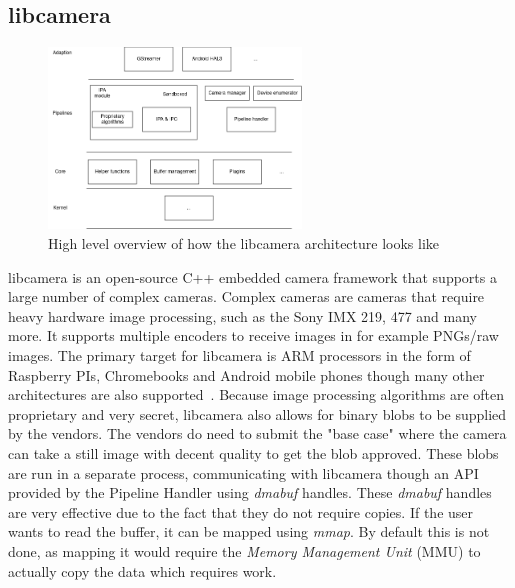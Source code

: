\subsection{libcamera}
\begin{figure}
    \begin{center}
        \includegraphics[width=0.60\textwidth]{figures/libcameraarch.png}
    \end{center}
    \caption{High level overview of how the libcamera architecture looks like}
    \label{fig:libcameraarch}
\end{figure}

libcamera is an open-source C++ embedded camera framework that supports a large
number of complex cameras. Complex cameras are cameras that require heavy
hardware image processing, such as the Sony IMX 219, 477 and many more. It
supports multiple encoders to receive images in for example PNGs/raw images.
The primary target for libcamera is ARM processors in the form of Raspberry
PIs, Chromebooks and Android mobile phones though many other architectures are
also supported~\cite{libcameraStack}. Because image processing algorithms are
often proprietary and very secret, libcamera also allows for binary blobs to be
supplied by the vendors. The vendors do need to submit the "base case" where
the camera can take a still image with decent quality to get the blob approved.
These blobs are run in a separate process, communicating with libcamera though
an API provided by the Pipeline Handler using \textit{dmabuf} handles. These
\textit{dmabuf} handles are very effective due to the fact that they do not
require copies. If the user wants to read the buffer, it can be mapped using
\textit{mmap}. By default this is not done, as mapping it would require the
\textit{Memory Management Unit} (MMU) to actually copy the data which requires
work.

